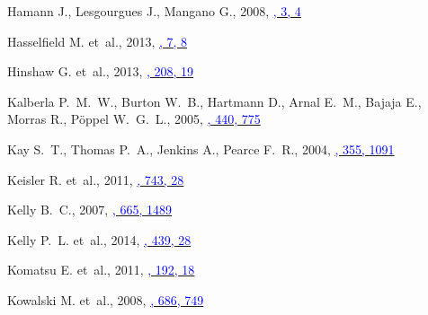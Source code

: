 \documentclass[useAMS,usenatbib,usegraphicx]{mn2e}
\begin{document}
\begin{thebibliography}{}
{Hamann} J., {Lesgourgues} J.,  {Mangano} G., 2008,
  \href{http://adsabs.harvard.edu/abs/2008JCAP...03..004H}{\textcolor{blue}{\jcap,
  3, 4}}

{Hasselfield} M. et~al., 2013,
  \href{http://adsabs.harvard.edu/abs/2013JCAP...07..008H}{\textcolor{blue}{\jcap,
  7, 8}}

{Hinshaw} G. et~al., 2013,
  \href{http://adsabs.harvard.edu/abs/2013ApJS..208...19H}{\textcolor{blue}{\apjs,
  208, 19}}

{Kalberla} P.~M.~W., {Burton} W.~B., {Hartmann} D., {Arnal} E.~M., {Bajaja} E.,
  {Morras} R.,  {P{\"o}ppel} W.~G.~L., 2005,
  \href{http://adsabs.harvard.edu/abs/2005A%26A...440..775K}{\textcolor{blue}{\aap,
  440, 775}}

{Kay} S.~T., {Thomas} P.~A., {Jenkins} A.,  {Pearce} F.~R., 2004,
  \href{http://adsabs.harvard.edu/abs/2004MNRAS.355.1091K}{\textcolor{blue}{\mnras,
  355, 1091}}

{Keisler} R. et~al., 2011,
  \href{http://adsabs.harvard.edu/abs/2011ApJ...743...28K}{\textcolor{blue}{\apj,
  743, 28}}

{Kelly} B.~C., 2007,
  \href{http://adsabs.harvard.edu/abs/2007ApJ...665.1489K}{\textcolor{blue}{\apj,
  665, 1489}}

{Kelly} P.~L. et~al., 2014,
  \href{http://adsabs.harvard.edu/abs/2014MNRAS.439...28K}{\textcolor{blue}{\mnras,
  439, 28}}

{Komatsu} E. et~al., 2011,
  \href{http://adsabs.harvard.edu/abs/2011ApJS..192...18K}{\textcolor{blue}{\apjs,
  192, 18}}

{Kowalski} M. et~al., 2008,
  \href{http://adsabs.harvard.edu/abs/2008ApJ...686..749K}{\textcolor{blue}{\apj,
  686, 749}}


\end{thebibliography}
\end{document}

